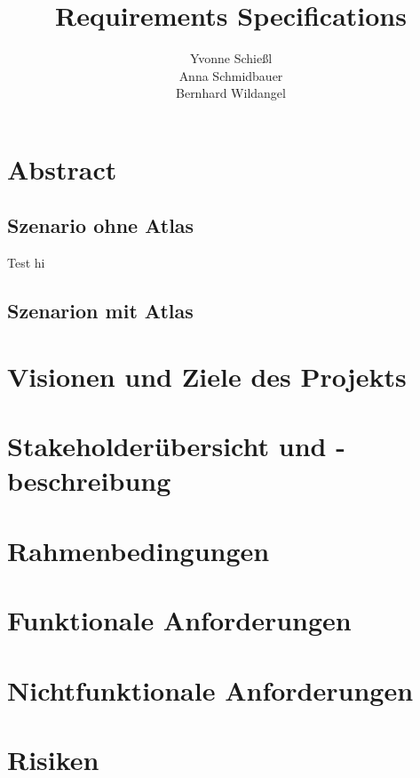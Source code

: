\documentclass[a4paper, 12pp]{article}
\title{\textbf{Requirements Specifications}}
\author{ Yvonne Schießl \\
		Anna Schmidbauer\\
		Bernhard Wildangel}
\date{}
\begin{document}
\maketitle
\section{Abstract}
\subsection{Szenario ohne Atlas}
Test
\newline hi 
\subsection{Szenarion mit Atlas}
\section{Visionen und Ziele des Projekts}
\section{Stakeholderübersicht und -beschreibung}
\section{Rahmenbedingungen}


\section{Funktionale Anforderungen}
\section{Nichtfunktionale Anforderungen}


\section{Risiken}
\end{document}
